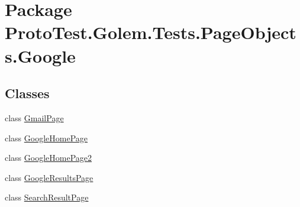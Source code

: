 \hypertarget{namespace_proto_test_1_1_golem_1_1_tests_1_1_page_objects_1_1_google}{\section{Package Proto\-Test.\-Golem.\-Tests.\-Page\-Objects.\-Google}
\label{namespace_proto_test_1_1_golem_1_1_tests_1_1_page_objects_1_1_google}
}
\subsection*{Classes}
\begin{DoxyCompactItemize}
\item 
class \hyperlink{class_proto_test_1_1_golem_1_1_tests_1_1_page_objects_1_1_google_1_1_gmail_page}{Gmail\-Page}
\item 
class \hyperlink{class_proto_test_1_1_golem_1_1_tests_1_1_page_objects_1_1_google_1_1_google_home_page}{Google\-Home\-Page}
\item 
class \hyperlink{class_proto_test_1_1_golem_1_1_tests_1_1_page_objects_1_1_google_1_1_google_home_page2}{Google\-Home\-Page2}
\item 
class \hyperlink{class_proto_test_1_1_golem_1_1_tests_1_1_page_objects_1_1_google_1_1_google_results_page}{Google\-Results\-Page}
\item 
class \hyperlink{class_proto_test_1_1_golem_1_1_tests_1_1_page_objects_1_1_google_1_1_search_result_page}{Search\-Result\-Page}
\end{DoxyCompactItemize}
